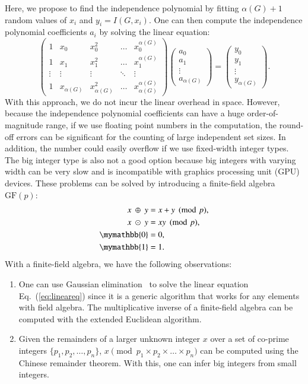 \documentclass[onefignum, onetabnum]{siamart190516}
\newcommand{\<}{\langle}
\renewcommand{\>}{\rangle}
\newcommand{\Eq}[1]{Eq.~(\ref{#1})}
\begin{document}
Here, we propose to find the independence polynomial by fitting $\alpha(G)+1$ random values of $x_{i}$ and $y_{i} = I(G,x_{i})$. One can then compute the independence polynomial coefficients $a_{i}$ by solving the linear equation: 
\begin{equation}
\left(\begin{matrix}
1 & x_0 & x_0^2 & \ldots & x_0^{\alpha(G)} \\
1 & x_1 & x_1^2 & \ldots & x_1^{\alpha(G)} \\
\vdots & \vdots & \vdots &\ddots & \vdots \\
1 & x_{\alpha(G)} & x_{\alpha(G)}^2 & \ldots & x_{\alpha(G)}^{\alpha(G)}
\end{matrix}\right)
\left(\begin{matrix}
a_0 \\ a_1 \\ \vdots \\ a_{\alpha(G)}
\end{matrix}\right)
= \left(\begin{matrix}
y_0 \\ y_1 \\ \vdots \\ y_{\alpha(G)}
\end{matrix}\right).\label{eq:lineareq}
\end{equation}
With this approach, we do not incur the linear overhead in space. However, because the independence polynomial coefficients can have a huge order-of-magnitude range, if we use floating point numbers in the computation, the round-off errors can be significant for the counting of large independent set sizes.
In addition, the number could easily overflow if we use fixed-width integer types.
The big integer type is also not a good option because big integers with varying width can be very slow and is incompatible with graphics processing unit (GPU) devices. These problems can be solved by introducing a finite-field algebra $\text{GF}(p)$:
\begin{equation}
\begin{split}
    x ~\oplus~ y &= x+y\pmod p,\\
    x ~\odot~ y &= xy\pmod p,\\
    \mymathbb{0} &= 0,\\
    \mymathbb{1} &= 1.
\end{split}\label{eq:finitefield}
\end{equation}
With a finite-field algebra, we have the following observations:
\begin{enumerate}
    \item One can use Gaussian elimination~\cite{Golub2013} to solve the linear equation \Eq{eq:lineareq} since it is a generic algorithm that works for any elements with field algebra. The multiplicative inverse of a finite-field algebra can be computed with the extended Euclidean algorithm.
    \item Given the remainders of a larger unknown integer $x$ over a set of co-prime integers $\{p_1, p_2, \ldots, p_n\}$,
    $x \pmod {p_1 \times p_2 \times \ldots \times p_n}$ can be computed using the Chinese remainder theorem. With this, one can infer big integers from small integers.
\end{enumerate}
\end{document}
